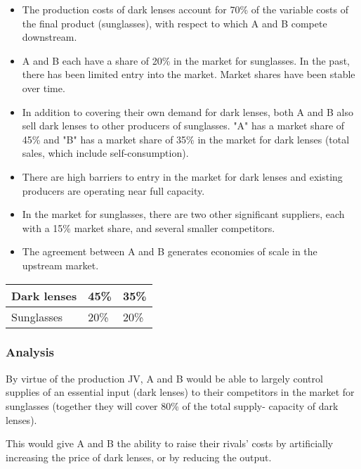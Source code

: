         \begin{itemize}
            \item The production costs of dark lenses account for 70\% of the variable costs of the final product (sunglasses), with respect to which A and B compete downstream.
            \item A and B each have a share of 20\% in the market for sunglasses. In the past, there has been limited entry into the market. Market shares have been stable over time.
            \item In addition to covering their own demand for dark lenses, both A and B also sell dark lenses to other producers of sunglasses. "A" has a market share of 45\% and "B" has a market share of 35\% in the market for dark lenses (total sales, which include self-consumption).
            \item There are high barriers to entry in the market for dark lenses and existing producers are operating near full capacity.
            \item In the market for sunglasses, there are two other significant suppliers, each with a 15\% market share, and several smaller competitors.
            \item The agreement between A and B generates economies of scale in the upstream market.
        \end{itemize}

        \begin{center}
        \begin{tabular}{l|l|l|}
            Dark lenses & 45\% & 35\% \\
            \hline
            Sunglasses & 20\% & 20\% \\
            \hline
        \end{tabular}
        \end{center}

        \subsubsection{Analysis}

            By virtue of the production JV, A and B would be able to largely control supplies of an essential input (dark lenses) to their competitors in the market for sunglasses (together they will cover 80\% of the total supply- capacity of dark lenses). 
            
            This would give A and B the ability to raise their rivals’ costs by artificially increasing the price of dark lenses, or by reducing the output. 
            

